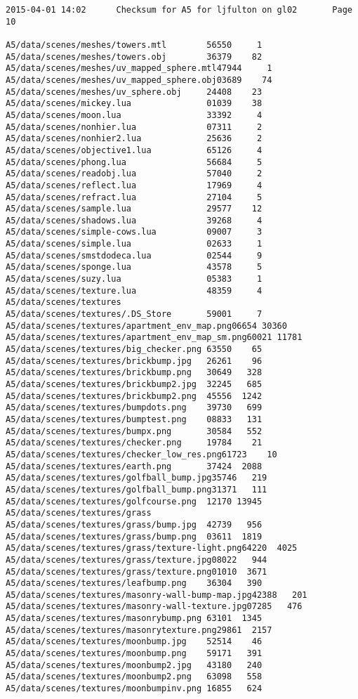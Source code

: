 \documentclass[12pt]{article}
\begin{document}
\begin{verbatim}
2015-04-01 14:02      Checksum for A5 for ljfulton on gl02       Page 10

A5/data/scenes/meshes/towers.mtl        56550     1
A5/data/scenes/meshes/towers.obj        36379    82
A5/data/scenes/meshes/uv_mapped_sphere.mtl47944     1
A5/data/scenes/meshes/uv_mapped_sphere.obj03689    74
A5/data/scenes/meshes/uv_sphere.obj     24408    23
A5/data/scenes/mickey.lua               01039    38
A5/data/scenes/moon.lua                 33392     4
A5/data/scenes/nonhier.lua              07311     2
A5/data/scenes/nonhier2.lua             25636     2
A5/data/scenes/objective1.lua           65126     4
A5/data/scenes/phong.lua                56684     5
A5/data/scenes/readobj.lua              57040     2
A5/data/scenes/reflect.lua              17969     4
A5/data/scenes/refract.lua              27104     5
A5/data/scenes/sample.lua               29577    12
A5/data/scenes/shadows.lua              39268     4
A5/data/scenes/simple-cows.lua          09007     3
A5/data/scenes/simple.lua               02633     1
A5/data/scenes/smstdodeca.lua           02544     9
A5/data/scenes/sponge.lua               43578     5
A5/data/scenes/suzy.lua                 05383     1
A5/data/scenes/texture.lua              48359     4
A5/data/scenes/textures                 
A5/data/scenes/textures/.DS_Store       59001     7
A5/data/scenes/textures/apartment_env_map.png06654 30360
A5/data/scenes/textures/apartment_env_map_sm.png60021 11781
A5/data/scenes/textures/big_checker.png 63550    65
A5/data/scenes/textures/brickbump.jpg   26261    96
A5/data/scenes/textures/brickbump.png   30649   328
A5/data/scenes/textures/brickbump2.jpg  32245   685
A5/data/scenes/textures/brickbump2.png  45556  1242
A5/data/scenes/textures/bumpdots.png    39730   699
A5/data/scenes/textures/bumptest.png    08833   131
A5/data/scenes/textures/bumpx.png       30584   552
A5/data/scenes/textures/checker.png     19784    21
A5/data/scenes/textures/checker_low_res.png61723    10
A5/data/scenes/textures/earth.png       37424  2088
A5/data/scenes/textures/golfball_bump.jpg35746   219
A5/data/scenes/textures/golfball_bump.png31371   111
A5/data/scenes/textures/golfcourse.png  12170 13945
A5/data/scenes/textures/grass           
A5/data/scenes/textures/grass/bump.jpg  42739   956
A5/data/scenes/textures/grass/bump.png  03611  1819
A5/data/scenes/textures/grass/texture-light.png64220  4025
A5/data/scenes/textures/grass/texture.jpg08022   944
A5/data/scenes/textures/grass/texture.png01010  3671
A5/data/scenes/textures/leafbump.png    36304   390
A5/data/scenes/textures/masonry-wall-bump-map.jpg42388   201
A5/data/scenes/textures/masonry-wall-texture.jpg07285   476
A5/data/scenes/textures/masonrybump.png 63101  1345
A5/data/scenes/textures/masonrytexture.png29861  2157
A5/data/scenes/textures/moonbump.jpg    52514    46
A5/data/scenes/textures/moonbump.png    59171   391
A5/data/scenes/textures/moonbump2.jpg   43180   240
A5/data/scenes/textures/moonbump2.png   63098   558
A5/data/scenes/textures/moonbumpinv.png 16855   624


\end{verbatim}
\end{document}
